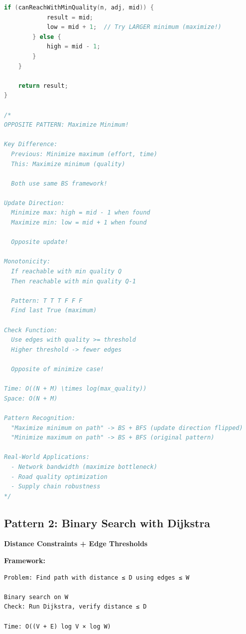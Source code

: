 \documentclass[11pt,a4paper,oneside]{book}
\begin{document}
\begin{lstlisting}[language=C++, caption=Complete Bottleneck Path Solutions - NEW PROBLEMS]
        if (canReachWithMinQuality(n, adj, mid)) {
            result = mid;
            low = mid + 1;  // Try LARGER minimum (maximize!)
        } else {
            high = mid - 1;
        }
    }
    
    return result;
}

/*
OPPOSITE PATTERN: Maximize Minimum!

Key Difference:
  Previous: Minimize maximum (effort, time)
  This: Maximize minimum (quality)
  
  Both use same BS framework!

Update Direction:
  Minimize max: high = mid - 1 when found
  Maximize min: low = mid + 1 when found
  
  Opposite update!

Monotonicity:
  If reachable with min quality Q
  Then reachable with min quality Q-1
  
  Pattern: T T T F F F
  Find last True (maximum)

Check Function:
  Use edges with quality >= threshold
  Higher threshold -> fewer edges
  
  Opposite of minimize case!

Time: O((N + M) \times log(max_quality))
Space: O(N + M)

Pattern Recognition:
  "Maximize minimum on path" -> BS + BFS (update direction flipped)
  "Minimize maximum on path" -> BS + BFS (original pattern)

Real-World Applications:
  - Network bandwidth (maximize bottleneck)
  - Road quality optimization
  - Supply chain robustness
*/
\end{lstlisting}

\subsection{Pattern 2: Binary Search with Dijkstra}

\begin{tcolorbox}[
    enhanced,breakable,
    colback=lightgray,
    colframe=accentorange,
    boxrule=2pt,
    arc=4mm,
    title=\textbf{Complete BS + Shortest Path Algorithms}
]
\textbf{Distance Constraints + Edge Thresholds}

\textbf{Framework:}
\begin{verbatim}
Problem: Find path with distance ≤ D using edges ≤ W

Binary search on W
Check: Run Dijkstra, verify distance ≤ D

Time: O((V + E) log V × log W)
\end{verbatim}
\end{tcolorbox}
\end{document}
